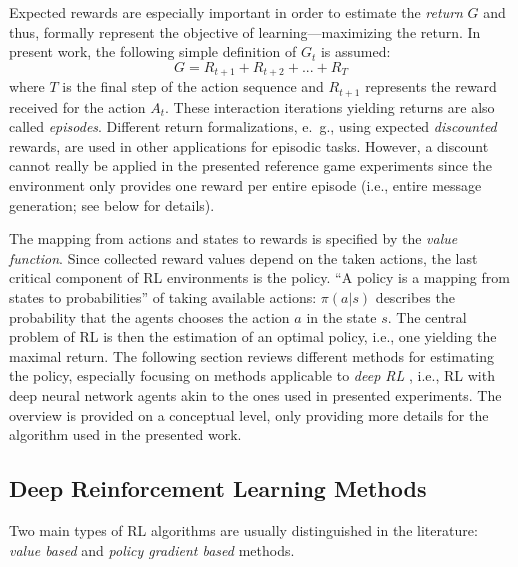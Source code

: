 Expected rewards are especially important in order to estimate the \textit{return} $G$ and thus, formally represent the objective of learning---maximizing the return. In present work, the following simple definition of $G_t$ is assumed: 
\begin{equation}
G = R_{t+1} + R_{t+2} + ... + R_T
\end{equation}
where $T$ is the final step of the action sequence and $R_{t+1}$ represents the reward received for the action $A_t$. These interaction iterations yielding returns are also called \textit{episodes}. Different return formalizations, e.~g., using expected \textit{discounted} rewards, are used in other applications for episodic tasks. However, a discount cannot really be applied in the presented reference game experiments since the environment only provides one reward per entire episode (i.e., entire message generation; see below for details).

The mapping from actions and states to rewards is specified by the \textit{value function}. Since collected reward values depend on the taken actions, the last critical component of RL environments is the policy. ``A policy is a mapping from states to probabilities'' of taking available actions: $\pi(a | s)$ describes the probability that the agents chooses the action $a$ in the state $s$. The central problem of RL is then the estimation of an optimal policy, i.e., one yielding the maximal return. The following section reviews different methods for estimating the policy, especially focusing on methods applicable to \textit{deep RL} \parencite{lecun2015deep}, i.e., RL with deep neural network agents akin to the ones used in presented experiments. The overview is provided on a conceptual level, only providing more details for the algorithm used in the presented work.

\subsection{Deep Reinforcement Learning Methods}
\label{rl_methods}
Two main types of RL algorithms are usually distinguished in the literature: \textit{value based} and \textit{policy gradient based} methods. 

